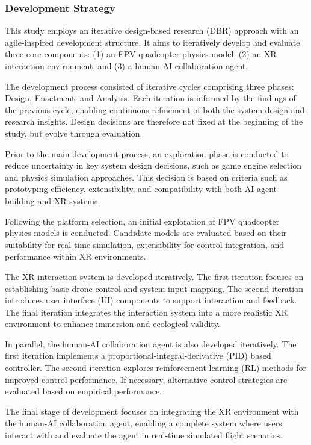 
\subsubsection{Development Strategy}

This study employs an iterative design-based research (DBR) approach with an agile-inspired development structure. It aims to iteratively develop and evaluate three core components: (1) an FPV quadcopter physics model, (2) an XR interaction environment, and (3) a human-AI collaboration agent.

The development process consisted of iterative cycles comprising three phases: Design, Enactment, and Analysis. Each iteration is informed by the findings of the previous cycle, enabling continuous refinement of both the system design and research insights. Design decisions are therefore not fixed at the beginning of the study, but evolve through evaluation.

Prior to the main development process, an exploration phase is conducted to reduce uncertainty in key system design decisions, such as game engine selection and physics simulation approaches. This decision is based on criteria such as prototyping efficiency, extensibility, and compatibility with both AI agent building and XR systems.

Following the platform selection, an initial exploration of FPV quadcopter physics models is conducted. Candidate models are evaluated based on their suitability for real-time simulation, extensibility for control integration, and performance within XR environments.

The XR interaction system is developed iteratively. The first iteration focuses on establishing basic drone control and system input mapping. The second iteration introduces user interface (UI) components to support interaction and feedback. The final iteration integrates the interaction system into a more realistic XR environment to enhance immersion and ecological validity.

In parallel, the human-AI collaboration agent is also developed iteratively. The first iteration implements a proportional-integral-derivative (PID) based controller. The second iteration explores reinforcement learning (RL) methods for improved control performance. If necessary, alternative control strategies are evaluated based on empirical performance.

The final stage of development focuses on integrating the XR environment with the human-AI collaboration agent, enabling a complete system where users interact with and evaluate the agent in real-time simulated flight scenarios.
